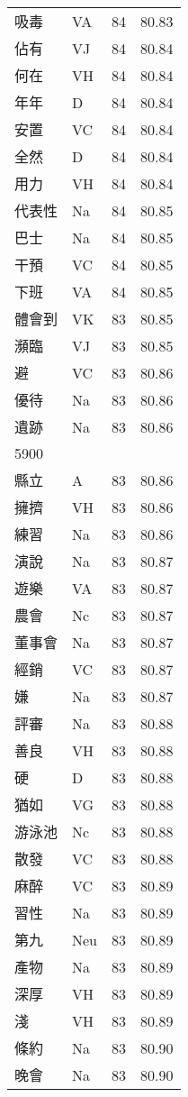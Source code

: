 \documentclass[twocolumn]{book}
\begin{document}
\begin{supertabular}{llrr}
吸毒 & VA & 84 &  80.83\\
佔有 & VJ & 84 &  80.84\\
何在 & VH & 84 &  80.84\\
年年 & D & 84 &  80.84\\
安置 & VC & 84 &  80.84\\
全然 & D & 84 &  80.84\\
用力 & VH & 84 &  80.84\\
代表性 & Na & 84 &  80.85\\
巴士 & Na & 84 &  80.85\\
干預 & VC & 84 &  80.85\\
下班 & VA & 84 &  80.85\\
體會到 & VK & 83 &  80.85\\
瀕臨 & VJ & 83 &  80.85\\
避 & VC & 83 &  80.86\\
優待 & Na & 83 &  80.86\\
遺跡 & Na & 83 &  80.86\\
5900\\
縣立 & A & 83 &  80.86\\
擁擠 & VH & 83 &  80.86\\
練習 & Na & 83 &  80.86\\
演說 & Na & 83 &  80.87\\
遊樂 & VA & 83 &  80.87\\
農會 & Nc & 83 &  80.87\\
董事會 & Na & 83 &  80.87\\
經銷 & VC & 83 &  80.87\\
嫌 & Na & 83 &  80.87\\
評審 & Na & 83 &  80.88\\
善良 & VH & 83 &  80.88\\
硬 & D & 83 &  80.88\\
猶如 & VG & 83 &  80.88\\
游泳池 & Nc & 83 &  80.88\\
散發 & VC & 83 &  80.88\\
麻醉 & VC & 83 &  80.89\\
習性 & Na & 83 &  80.89\\
第九 & Neu & 83 &  80.89\\
產物 & Na & 83 &  80.89\\
深厚 & VH & 83 &  80.89\\
淺 & VH & 83 &  80.89\\
條約 & Na & 83 &  80.90\\
晚會 & Na & 83 &  80.90\\

\end{supertabular}
\end{document}
